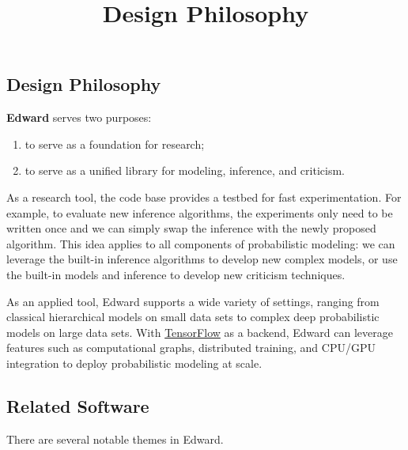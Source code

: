 \title{Design Philosophy}

\subsection{Design Philosophy}

\textbf{Edward} serves two purposes:

\begin{enumerate}
\def\labelenumi{\arabic{enumi}.}
\item
  to serve as a foundation for research;
\item
  to serve as a unified library for modeling, inference, and criticism.
\end{enumerate}

As a research tool, the code base provides a testbed for fast
experimentation. For example, to evaluate new inference algorithms,
the experiments only need to be written once and we can simply swap
the inference with the newly proposed algorithm. This idea applies to
all components of probabilistic modeling: we can leverage the built-in
inference algorithms to develop new complex models, or use the
built-in models and inference to develop new criticism techniques.

As an applied tool, Edward supports a wide variety of settings,
ranging from classical hierarchical models on small data sets to
complex deep probabilistic models on large data sets. With
\href{https://www.tensorflow.org}{TensorFlow} as a backend, Edward can
leverage features such as computational graphs, distributed training,
and CPU/GPU integration to deploy probabilistic modeling at scale.

\subsection{Related Software}\label{related-software}

There are several notable themes in Edward.

